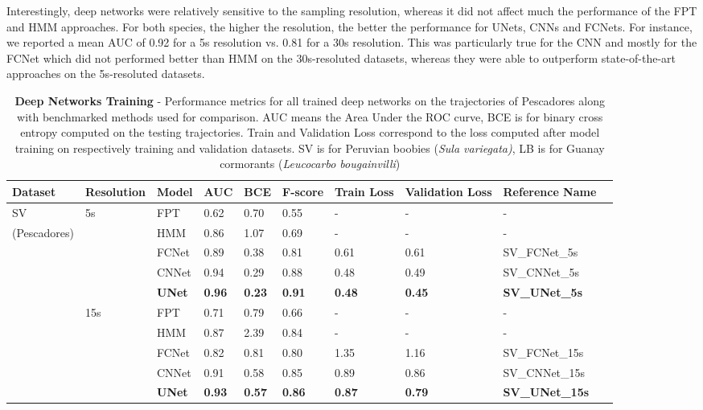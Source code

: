 \documentclass{article}
\begin{document}
Interestingly, deep networks were relatively sensitive to the sampling resolution, whereas it did not affect much the performance of the FPT and HMM approaches. For both species, the higher the resolution, the better the performance for UNets, CNNs and FCNets. For instance, we reported a mean AUC of 0.92 for a 5s resolution vs. 0.81 for a 30s resolution. This was particularly true for the CNN and mostly for the FCNet which did not performed better than HMM on the 30s-resoluted datasets, whereas they were able to outperform state-of-the-art approaches on the 5s-resoluted datasets.

\begin{table}[h]
 \caption{\textbf{Deep Networks Training} - Performance metrics for all trained deep networks on the trajectories of Pescadores along with benchmarked methods used for comparison. AUC means the Area Under the ROC curve, BCE is for binary cross entropy computed on the testing trajectories. Train and Validation Loss correspond to the loss computed after model training on respectively training and validation datasets. SV is for Peruvian boobies (\textit{Sula variegata)}, LB is for Guanay cormorants (\textit{Leucocarbo bougainvilli})}
  \centering
  \begin{tabular}{llllllllll}
    \toprule
    Dataset  &  Resolution &  Model &  AUC & BCE & F-score & Train Loss & Validation Loss & Reference Name\\
    \midrule
    SV       & 5s  & FPT    & 0.62 & 0.70 & 0.55 & - & -  & -\\
(Pescadores) &     & HMM    & 0.86 & 1.07 & 0.69 & - & -  & - \\
             &     & FCNet  & 0.89 & 0.38 & 0.81 & 0.61 & 0.61 & SV\_FCNet\_5s \\
             &     & CNNet  & 0.94 & 0.29 & 0.88 & 0.48 & 0.49 & SV\_CNNet\_5s \\
             &     & {\bf UNet} & {\bf 0.96} & {\bf 0.23} & {\bf 0.91} & {\bf 0.48} & {\bf 0.45} & {\bf SV\_UNet\_5s}\\
             & 15s & FPT    & 0.71 & 0.79 & 0.66 & - & - & - \\
             &     & HMM    & 0.87 & 2.39 & 0.84 & - & - & - \\
             &     & FCNet  & 0.82 & 0.81 & 0.80 & 1.35 & 1.16 & SV\_FCNet\_15s \\
             &     & CNNet  & 0.91 & 0.58 & 0.85 & 0.89 & 0.86 & SV\_CNNet\_15s \\
             &     & {\bf UNet} & {\bf 0.93} & {\bf 0.57} & {\bf 0.86} & {\bf 0.87} & {\bf 0.79} & {\bf SV\_UNet\_15s} \\

\end{tabular}
\end{table}
\end{document}
